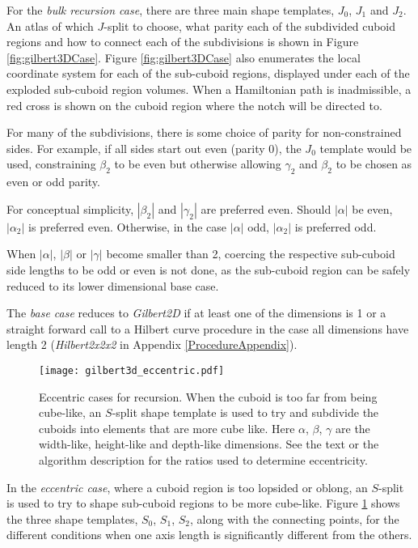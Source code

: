 For the \textit{bulk recursion case}, there are three main shape templates, $J_0$, $J_1$ and $J_2$.
An atlas of which $J$-split to choose, what parity each of the subdivided cuboid regions and how
to connect each of the subdivisions is shown in Figure \ref{fig:gilbert3DCase}.
Figure \ref{fig:gilbert3DCase} also enumerates the local coordinate system for each of the sub-cuboid
regions, displayed under each of the exploded sub-cuboid region volumes.
When a Hamiltonian path is inadmissible,
a red cross is shown on the cuboid region where the notch will be directed to.

For many of the subdivisions, there is some choice of parity for non-constrained sides.
For example, if all sides start out even (parity $0$), the $J_0$ template would be used, constraining
$\beta_2$ to be even but otherwise allowing $\gamma_2$ and $\beta_2$ to be chosen as even or odd parity.

For conceptual simplicity, $|\beta_2|$ and $|\gamma_2|$ are preferred even.
Should $|\alpha|$ be even, $|\alpha_2|$ is preferred even.
Otherwise, in the case $|\alpha|$ odd, $|\alpha_2|$ is preferred odd.

When $|\alpha|$, $|\beta|$ or $|\gamma|$ become smaller than 2, coercing the respective sub-cuboid
side lengths to be odd or even is not done, as the sub-cuboid region can be safely reduced to its
lower dimensional base case.

The \textit{base case} reduces to \textit{Gilbert2D} if at least one of the dimensions is 1 or a straight forward call to a Hilbert curve
procedure in the case all dimensions have length 2 (\textit{Hilbert2x2x2} in Appendix \ref{ProcedureAppendix}).

\begin{figure}[h]
  \centering
  \texttt{[image: gilbert3d\_eccentric.pdf]}
  \caption{ Eccentric cases for recursion. When the cuboid is too far from being cube-like, an $S$-split shape template is used to try and subdivide the cuboids into elements that are more cube like. Here $\alpha$, $\beta$, $\gamma$ are the width-like, height-like and depth-like dimensions. See the text or the algorithm description for the ratios used to determine eccentricity. }
  \label{fig:gilbert3DEccentricCase}
\end{figure}

In the \textit{eccentric case}, where a cuboid region is too lopsided or oblong, an $S$-split is used to try to shape
sub-cuboid regions to be more cube-like.
Figure \ref{fig:gilbert3DEccentricCase} shows the three shape templates, $S_0$, $S_1$, $S_2$, along with the connecting
points, for the different conditions when one axis length is significantly different from the others.

